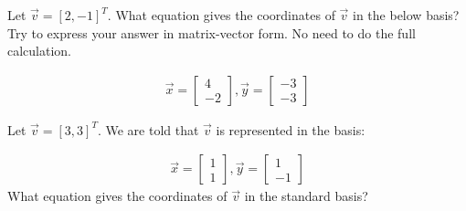 \begin{enumerate}
  \qitem Let $\vec{v} = [2,-1]^{T}$. What equation gives the coordinates of $\vec{v}$ in the below basis? 
  Try to express your answer in matrix-vector form. No need to do the full calculation.

  \begin{gather*}
    \vec{x} =
    \begin{bmatrix}
      4 \\
      -2
    \end{bmatrix},
    \vec{y} = \begin{bmatrix}
      -3 \\
      -3
    \end{bmatrix}
  \end{gather*}


  \qitem Let $\vec{v} = [3,3]^{T}$. We are told that $\vec{v}$ is represented in the basis:

  \begin{gather*}
    \vec{x} =
    \begin{bmatrix}
      1 \\
      1
    \end{bmatrix},
    \vec{y} = \begin{bmatrix}
      1 \\
      -1
    \end{bmatrix}
  \end{gather*}
  What equation gives the coordinates of $\vec{v}$ in the standard basis?


\end{enumerate}

